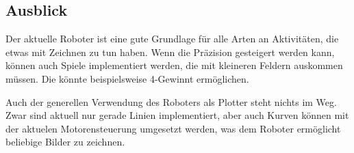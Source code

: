 \documentclass[conference,compsoc,final,a4paper]{IEEEtran}
\begin{document}
\subsection{Ausblick}

Der aktuelle Roboter ist eine gute Grundlage für alle Arten an Aktivitäten, die etwas mit Zeichnen zu tun haben. Wenn die Präzision
gesteigert werden kann, können auch Spiele implementiert werden, die mit kleineren Feldern auskommen müssen. Die könnte beispielsweise
4-Gewinnt ermöglichen.

Auch der generellen Verwendung des Roboters als Plotter steht nichts im Weg. Zwar sind aktuell nur gerade Linien implementiert, aber
auch Kurven können mit der aktuelen Motorensteuerung umgesetzt werden, was dem Roboter ermöglicht beliebige Bilder zu zeichnen.

\printbibliography
\end{document}
